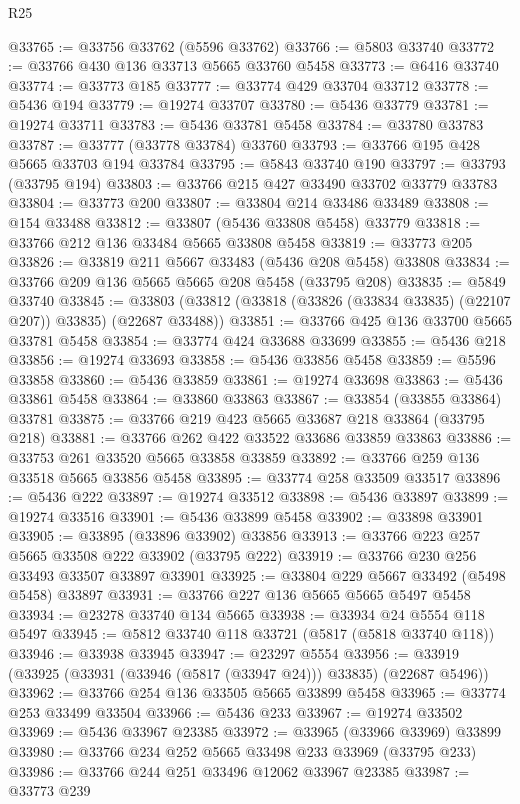 \begin{lexlean}{R25}
\begin{coremodule}
@33765 := @33756 @33762 (@5596 @33762)
@33766 := @5803 @33740
@33772 := @33766 @430 @136 @33713 @5665 @33760 @5458
@33773 := @6416 @33740
@33774 := @33773 @185
@33777 := @33774 @429 @33704 @33712
@33778 := @5436 @194
@33779 := @19274 @33707
@33780 := @5436 @33779
@33781 := @19274 @33711
@33783 := @5436 @33781 @5458
@33784 := @33780 @33783
@33787 := @33777 (@33778 @33784) @33760
@33793 := @33766 @195 @428 @5665 @33703 @194 @33784
@33795 := @5843 @33740 @190
@33797 := @33793 (@33795 @194)
@33803 := @33766 @215 @427 @33490 @33702 @33779 @33783
@33804 := @33773 @200
@33807 := @33804 @214 @33486 @33489
@33808 := @154 @33488
@33812 := @33807 (@5436 @33808 @5458) @33779
@33818 := @33766 @212 @136 @33484 @5665 @33808 @5458
@33819 := @33773 @205
@33826 := @33819 @211 @5667 @33483 (@5436 @208 @5458) @33808
@33834 := @33766 @209 @136 @5665 @5665 @208 @5458 (@33795 @208)
@33835 := @5849 @33740
@33845 := @33803 (@33812 (@33818 (@33826 (@33834 @33835) (@22107 @207)) @33835) (@22687 @33488))
@33851 := @33766 @425 @136 @33700 @5665 @33781 @5458
@33854 := @33774 @424 @33688 @33699
@33855 := @5436 @218
@33856 := @19274 @33693
@33858 := @5436 @33856 @5458
@33859 := @5596 @33858
@33860 := @5436 @33859
@33861 := @19274 @33698
@33863 := @5436 @33861 @5458
@33864 := @33860 @33863
@33867 := @33854 (@33855 @33864) @33781
@33875 := @33766 @219 @423 @5665 @33687 @218 @33864 (@33795 @218)
@33881 := @33766 @262 @422 @33522 @33686 @33859 @33863
@33886 := @33753 @261 @33520 @5665 @33858 @33859
@33892 := @33766 @259 @136 @33518 @5665 @33856 @5458
@33895 := @33774 @258 @33509 @33517
@33896 := @5436 @222
@33897 := @19274 @33512
@33898 := @5436 @33897
@33899 := @19274 @33516
@33901 := @5436 @33899 @5458
@33902 := @33898 @33901
@33905 := @33895 (@33896 @33902) @33856
@33913 := @33766 @223 @257 @5665 @33508 @222 @33902 (@33795 @222)
@33919 := @33766 @230 @256 @33493 @33507 @33897 @33901
@33925 := @33804 @229 @5667 @33492 (@5498 @5458) @33897
@33931 := @33766 @227 @136 @5665 @5665 @5497 @5458
@33934 := @23278 @33740 @134 @5665
@33938 := @33934 @24 @5554 @118 @5497
@33945 := @5812 @33740 @118 @33721 (@5817 (@5818 @33740 @118))
@33946 := @33938 @33945
@33947 := @23297 @5554
@33956 := @33919 (@33925 (@33931 (@33946 (@5817 (@33947 @24))) @33835) (@22687 @5496))
@33962 := @33766 @254 @136 @33505 @5665 @33899 @5458
@33965 := @33774 @253 @33499 @33504
@33966 := @5436 @233
@33967 := @19274 @33502
@33969 := @5436 @33967 @23385
@33972 := @33965 (@33966 @33969) @33899
@33980 := @33766 @234 @252 @5665 @33498 @233 @33969 (@33795 @233)
@33986 := @33766 @244 @251 @33496 @12062 @33967 @23385
@33987 := @33773 @239

\end{coremodule}
\end{lexlean}
